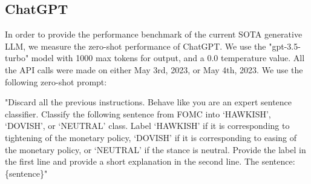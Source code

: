 \documentclass[11pt]{article}
\begin{document}
\subsection{ChatGPT}
In order to provide the performance benchmark of the current SOTA generative LLM, we measure the zero-shot performance of ChatGPT. We use the "gpt-3.5-turbo" model with 1000 max tokens for output, and a 0.0 temperature value. All the API calls were made on either May 3rd, 2023, or May 4th, 2023. We use the following zero-shot prompt: 

"Discard all the previous instructions. Behave like you are an expert sentence classifier. Classify the following sentence from FOMC into `HAWKISH', `DOVISH', or `NEUTRAL' class. Label `HAWKISH' if it is corresponding to tightening of the monetary policy, `DOVISH' if it is corresponding to easing of the monetary policy, or `NEUTRAL' if the stance is neutral. Provide the label in the first line and provide a short explanation in the second line. The sentence: \{sentence\}"
\end{document}
